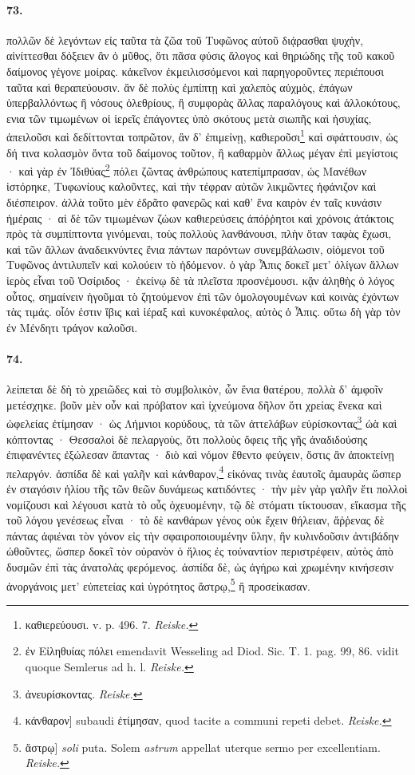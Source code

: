 \documentclass[a4paper, 11pt, oneside, polutonikogreek, german]{article}
\begin{document}
\paragraph{73.}
πολλῶν δὲ λεγόντων εἰς ταῦτα τὰ ζῶα τοῦ Τυφῶνος αὐτοῦ διᾴρασθαι ψυχὴν, αἰνίττεσθαι δόξειεν ἂν ὁ μῦθος, ὅτι πᾶσα φύσις ἄλογος καὶ θηριώδης τῆς τοῦ κακοῦ δαίμονος γέγονε μοίρας. κἀκεῖνον ἐκμειλισσόμενοι καὶ παρηγοροῦντες περιέπουσι ταῦτα καὶ θεραπεύουσιν. ἂν δὲ πολὺς ἐμπίπτῃ καὶ χαλεπὸς αὐχμὸς, ἐπάγων ὑπερβαλλόντως ἢ νόσους ὀλεθρίους, ἢ συμφορὰς ἄλλας παραλόγους καὶ ἀλλοκότους, ενια τῶν τιμωμένων οἱ ἱερεῖς ἐπάγοντες ὑπὸ σκότους μετὰ σιωπῆς καὶ ἡσυχίας, ἀπειλοῦσι καὶ δεδίττονται τοπρῶτον, ἂν δ' ἐπιμείνῃ, καθιεροῦσι\footnote{καθιερεύουσι. v. p. 496. 7. \emph{Reiske.}} καὶ σφάττουσιν, ὡς δή τινα κολασμὸν ὄντα τοῦ δαίμονος τοῦτον, ἢ καθαρμὸν ἄλλως μέγαν ἐπὶ μεγίστοις · καὶ γὰρ ἐν Ἰδιθύας\footnote{ἐν Εἰληθυίας πόλει emendavit Wesseling ad Diod. Sic. T. 1. pag. 99, 86. vidit quoque Semlerus ad h. l. \emph{Reiske.}} πόλει ζῶντας ἀνθρώπους κατεπίμπρασαν, ὡς Μανέθων ἱστόρηκε, Τυφωνίους καλοῦντες, καὶ τὴν τέφραν αὐτῶν λικμῶντες ἠφάνιζον καὶ διέσπειρον. ἀλλὰ τοῦτο μὲν ἐδρᾶτο φανερῶς καὶ καθ' ἕνα καιρὸν ἐν ταῖς κυνάσιν ἡμέραις · αἱ δὲ τῶν τιμωμένων ζώων καθιερεύσεις ἀπόῤῥητοι καὶ χρόνοις ἀτάκτοις πρὸς τὰ συμπίπτοντα γινόμεναι, τοὺς πολλοὺς λανθάνουσι, πλὴν ὅταν ταφὰς ἔχωσι, καὶ τῶν ἄλλων ἀναδεικνύντες ἔνια πάντων παρόντων συνεμβάλωσιν, οἰόμενοι τοῦ Τυφῶνος ἀντιλυπεῖν καὶ κολούειν τὸ ἡδόμενον. ὁ γὰρ Ἆπις δοκεῖ μετ' ὀλίγων ἄλλων ἱερὸς εἶναι τοῦ Ὀσίριδος · ἐκείνῳ δὲ τὰ πλεῖστα προσνέμουσι. κᾂν ἀληθὴς ὁ λόγος οὗτος, σημαίνειν ἡγοῦμαι τὸ ζητούμενον ἐπὶ τῶν ὁμολογουμένων καὶ κοινὰς ἐχόντων τὰς τιμάς. οἷόν ἐστιν ἴβις καὶ ἱέραξ καὶ κυνοκέφαλος, αὐτὸς ὁ Ἆπις. οὕτω δὴ γὰρ τὸν ἐν Μένδητι τράγον καλοῦσι.

\paragraph{74.}
λείπεται δὲ δὴ τὸ χρειῶδες καὶ τὸ συμβολικὸν, ὧν ἔνια θατέρου, πολλὰ δ' ἀμφοῖν μετέσχηκε. βοῦν μὲν οὖν καὶ πρόβατον καὶ ἰχνεύμονα δῆλον ὅτι χρείας ἕνεκα καὶ ὠφελείας ἐτίμησαν · ὡς Λήμνιοι κορύδους, τὰ τῶν ἀττελάβων εὑρίσκοντας\footnote{ἀνευρίσκοντας. \emph{Reiske.}} ὠὰ καὶ κόπτοντας · Θεσσαλοὶ δὲ πελαργοὺς, ὅτι πολλοὺς ὄφεις τῆς γῆς ἀναδιδούσης ἐπιφανέντες ἐξώλεσαν ἅπαντας · διὸ καὶ νόμον ἔθεντο φεύγειν, ὅστις ἂν ἀποκτείνῃ πελαργόν. ἀσπίδα δὲ καὶ γαλῆν καὶ κάνθαρον,\footnote{κάνθαρον] subaudi ἐτίμησαν, quod tacite a communi repeti debet. \emph{Reiske.}} εἰκόνας τινὰς ἑαυτοῖς ἀμαυρὰς ὥσπερ ἐν σταγόσιν ἡλίου τῆς τῶν θεῶν δυνάμεως κατιδόντες · τὴν μὲν γὰρ γαλῆν ἔτι πολλοὶ νομίζουσι καὶ λέγουσι κατὰ τὸ οὖς ὀχευομένην, τῷ δὲ στόματι τίκτουσαν, εἴκασμα τῆς τοῦ λόγου γενέσεως εἶναι · τὸ δὲ κανθάρων γένος οὐκ ἔχειν θήλειαν, ἄῤῥενας δὲ πάντας ἀφιέναι τὸν γόνον εἰς τὴν σφαιροποιουμένην ὕλην, ἣν κυλινδοῦσιν ἀντιβάδην ὠθοῦντες, ὥσπερ δοκεῖ τὸν οὐρανὸν ὁ ἥλιος ἐς τοὐναντίον περιστρέφειν, αὐτὸς ἀπὸ δυσμῶν ἐπὶ τὰς ἀνατολὰς φερόμενος. ἀσπίδα δὲ, ὡς ἀγήρω καὶ χρωμένην κινήσεσιν ἀνοργάνοις μετ' εὐπετείας καὶ ὑγρότητος ἄστρῳ,\footnote{ἄστρῳ] \emph{soli} puta. Solem \emph{astrum} appellat uterque sermo per excellentiam. \emph{Reiske.}} ἢ προσείκασαν.
\end{document}
